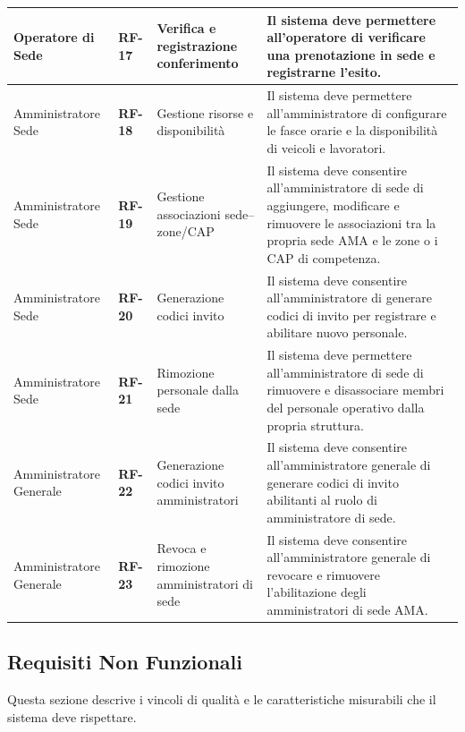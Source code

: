 \begin{center}
\begin{longtable}{|p{2.8cm}|p{1.2cm}|p{3.8cm}|p{6.2cm}|}
Operatore di Sede & \textbf{RF-17} & Verifica e registrazione conferimento & Il sistema deve permettere all'operatore di verificare una prenotazione in sede e registrarne l'esito. \\ \hline

Amministratore Sede & \textbf{RF-18} & Gestione risorse e disponibilità & Il sistema deve permettere all'amministratore di configurare le fasce orarie e la disponibilità di veicoli e lavoratori. \\ \hline

Amministratore Sede & \textbf{RF-19} & Gestione associazioni sede--zone/CAP & Il sistema deve consentire all'amministratore di sede di aggiungere, modificare e rimuovere le associazioni tra la propria sede AMA e le zone o i CAP di competenza. \\ \hline

Amministratore Sede & \textbf{RF-20} & Generazione codici invito & Il sistema deve consentire all'amministratore di generare codici di invito per registrare e abilitare nuovo personale. \\ \hline

Amministratore Sede & \textbf{RF-21} & Rimozione personale dalla sede & Il sistema deve permettere all'amministratore di sede di rimuovere e disassociare membri del personale operativo dalla propria struttura. \\ \hline

Amministratore Generale & \textbf{RF-22} & Generazione codici invito amministratori & Il sistema deve consentire all'amministratore generale di generare codici di invito abilitanti al ruolo di amministratore di sede. \\ \hline

Amministratore Generale & \textbf{RF-23} & Revoca e rimozione amministratori di sede & Il sistema deve consentire all'amministratore generale di revocare e rimuovere l'abilitazione degli amministratori di sede AMA. \\ \hline
\end{longtable}
\end{center}

\subsection{Requisiti Non Funzionali}
Questa sezione descrive i vincoli di qualità e le caratteristiche misurabili che il sistema deve rispettare.

